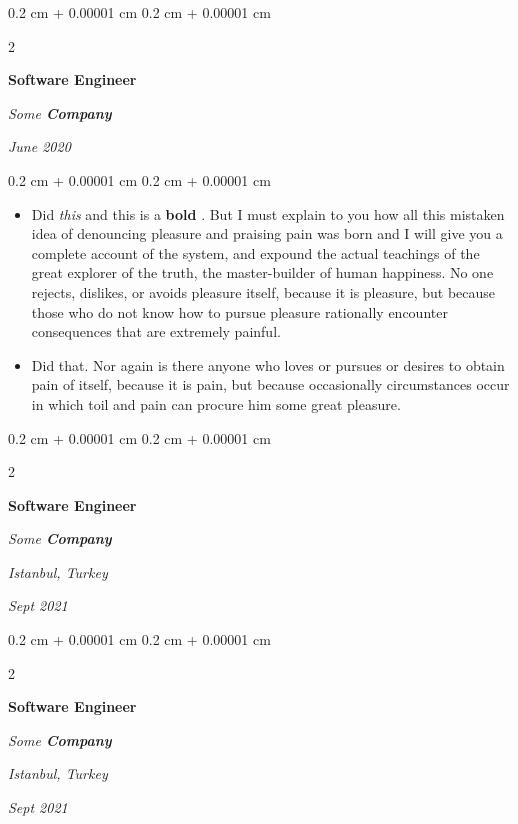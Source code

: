 \documentclass[10pt, letterpaper]{article}
\newenvironment{highlights}{
    \begin{itemize}[
        topsep=0.10 cm,
        parsep=0.10 cm,
        partopsep=0pt,
        itemsep=0pt,
        leftmargin=0.4 cm + 10pt
    ]
}{
    \end{itemize}
} %
\newenvironment{onecolentry}{
    \begin{adjustwidth}{
        0.2 cm + 0.00001 cm
    }{
        0.2 cm + 0.00001 cm
    }
}{
    \end{adjustwidth}
} %
\newenvironment{twocolentry}[2][]{
    \onecolentry
    \def\secondColumn{#2}
    \setcolumnwidth{\fill, 4.5 cm}
    \begin{paracol}{2}
}{
    \switchcolumn \raggedleft \secondColumn
    \end{paracol}
    \endonecolentry
} %
\let\hrefWithoutArrow\href
\renewcommand{\href}[2]{\hrefWithoutArrow{#1}{\ifthenelse{\equal{#2}{}}{ }{#2 }\raisebox{.15ex}{\footnotesize \faExternalLink*}}}
\begin{document}
        \vspace{0.2 cm}

        \begin{twocolentry}{
            
            
        \textit{June 2020}}
            \textbf{Software Engineer}
            
            \textit{Some \textbf{Company}}
        \end{twocolentry}

        \vspace{0.10 cm}
        \begin{onecolentry}
            \begin{highlights}
                \item Did \textit{this} and this is a \textbf{bold} \href{https://example.com}{link}. But I must explain to you how all this mistaken idea of denouncing pleasure and praising pain was born and I will give you a complete account of the system, and expound the actual teachings of the great explorer of the truth, the master-builder of human happiness. No one rejects, dislikes, or avoids pleasure itself, because it is pleasure, but because those who do not know how to pursue pleasure rationally encounter consequences that are extremely painful.
                \item Did that. Nor again is there anyone who loves or pursues or desires to obtain pain of itself, because it is pain, but because occasionally circumstances occur in which toil and pain can procure him some great pleasure.
            \end{highlights}
        \end{onecolentry}


        \vspace{0.2 cm}

        \begin{twocolentry}{
        \textit{Istanbul, Turkey}    
            
        \textit{Sept 2021}}
            \textbf{Software Engineer}
            
            \textit{Some \textbf{Company}}
        \end{twocolentry}



        \vspace{0.2 cm}

        \begin{twocolentry}{
        \textit{Istanbul, Turkey}    
            
        \textit{Sept 2021}}
            \textbf{Software Engineer}
            
            \textit{Some \textbf{Company}}
        \end{twocolentry}
\end{document}
